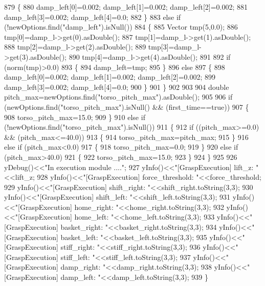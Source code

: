 \begin{DoxyCode}
879     \{
880         damp_left[0]=0.002; damp_left[1]=0.002; damp_left[2]=0.002;
881         damp_left[3]=0.002; damp_left[4]=0.0;
882     \}
883     \textcolor{keywordflow}{else} \textcolor{keywordflow}{if} (!newOptions.find(\textcolor{stringliteral}{"damp\_left"}).isNull())
884     \{
885         Vector tmp(5,0.0);
886         tmp[0]=damp\_l->get(0).asDouble();
887         tmp[1]=damp\_l->get(1).asDouble();
888         tmp[2]=damp\_l->get(2).asDouble();
889         tmp[3]=damp\_l->get(3).asDouble();
890         tmp[4]=damp\_l->get(4).asDouble();
891 
892         \textcolor{keywordflow}{if} (norm(tmp)>0.0)
893         \{
894             damp_left=tmp;
895         \}
896         \textcolor{keywordflow}{else}
897         \{
898             damp_left[0]=0.002; damp_left[1]=0.002; damp_left[2]=0.002;
899             damp_left[3]=0.002; damp_left[4]=0.0; 
900         \}
901     \}
902 
903 
904     \textcolor{keywordtype}{double} pitch\_max=newOptions.find(\textcolor{stringliteral}{"torso\_pitch\_max"}).asDouble();
905 
906     \textcolor{keywordflow}{if} (newOptions.find(\textcolor{stringliteral}{"torso\_pitch\_max"}).isNull() && (first\_time==\textcolor{keyword}{true}))
907     \{
908         torso_pitch_max=15.0;
909     \}
910     \textcolor{keywordflow}{else} \textcolor{keywordflow}{if} (!newOptions.find(\textcolor{stringliteral}{"torso\_pitch\_max"}).isNull())
911     \{
912         \textcolor{keywordflow}{if} ((pitch\_max>=0.0) && (pitch\_max<=40.0))
913         \{
914             torso_pitch_max=pitch\_max;
915         \}
916         \textcolor{keywordflow}{else} \textcolor{keywordflow}{if} (pitch\_max<0.0)
917         \{
918             torso_pitch_max=0.0;
919         \}
920         \textcolor{keywordflow}{else} \textcolor{keywordflow}{if} (pitch\_max>40.0)
921         \{
922             torso_pitch_max=15.0;
923         \}
924     \}
925 
926     yDebug()<<\textcolor{stringliteral}{"In execution module ...."};
927     yInfo()<<\textcolor{stringliteral}{"[GraspExecution] lift\_z:          "}<<lift_z;
928     yInfo()<<\textcolor{stringliteral}{"[GraspExecution] force\_threshold: "}<<force_threshold;
929     yInfo()<<\textcolor{stringliteral}{"[GraspExecution] shift\_right:     "}<<shift_right.toString(3,3);
930     yInfo()<<\textcolor{stringliteral}{"[GraspExecution] shift\_left:      "}<<shift_left.toString(3,3);
931     yInfo()<<\textcolor{stringliteral}{"[GraspExecution] home\_right:      "}<<home_right.toString(3,3);
932     yInfo()<<\textcolor{stringliteral}{"[GraspExecution] home\_left:       "}<<home_left.toString(3,3);
933     yInfo()<<\textcolor{stringliteral}{"[GraspExecution] basket\_right:    "}<<basket_right.toString(3,3);
934     yInfo()<<\textcolor{stringliteral}{"[GraspExecution] basket\_left:     "}<<basket_left.toString(3,3);
935     yInfo()<<\textcolor{stringliteral}{"[GraspExecution] stiff\_right:     "}<<stiff_right.toString(3,3);
936     yInfo()<<\textcolor{stringliteral}{"[GraspExecution] stiff\_left:      "}<<stiff_left.toString(3,3);
937     yInfo()<<\textcolor{stringliteral}{"[GraspExecution] damp\_right:      "}<<damp_right.toString(3,3);
938     yInfo()<<\textcolor{stringliteral}{"[GraspExecution] damp\_left:       "}<<damp_left.toString(3,3);
939 \}
\end{DoxyCode}


